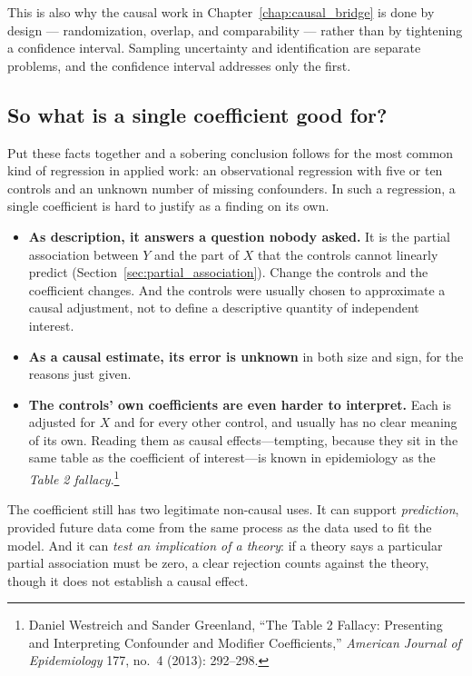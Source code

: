 \documentclass[11pt]{report}
\begin{document}
This is also why the causal work in Chapter~\ref{chap:causal_bridge} is done by design --- randomization, overlap, and comparability --- rather than by tightening a confidence interval. Sampling uncertainty and identification are separate problems, and the confidence interval addresses only the first.

\subsection{So what is a single coefficient good for?}

Put these facts together and a sobering conclusion follows for the most common kind of regression in applied work: an observational regression with five or ten controls and an unknown number of missing confounders. In such a regression, a single coefficient is hard to justify as a finding on its own.

\begin{itemize}[leftmargin=2em]
\item \textbf{As description, it answers a question nobody asked.} It is the partial association between \(Y\) and the part of \(X\) that the controls cannot linearly predict (Section~\ref{sec:partial_association}). Change the controls and the coefficient changes. And the controls were usually chosen to approximate a causal adjustment, not to define a descriptive quantity of independent interest.
\item \textbf{As a causal estimate, its error is unknown} in both size and sign, for the reasons just given.
\item \textbf{The controls' own coefficients are even harder to interpret.} Each is adjusted for \(X\) and for every other control, and usually has no clear meaning of its own. Reading them as causal effects---tempting, because they sit in the same table as the coefficient of interest---is known in epidemiology as the \emph{Table 2 fallacy}.\footnote{Daniel Westreich and Sander Greenland, ``The Table 2 Fallacy: Presenting and Interpreting Confounder and Modifier Coefficients,'' \emph{American Journal of Epidemiology} 177, no.~4 (2013): 292--298.}
\end{itemize}

The coefficient still has two legitimate non-causal uses. It can support \emph{prediction}, provided future data come from the same process as the data used to fit the model. And it can \emph{test an implication of a theory}: if a theory says a particular partial association must be zero, a clear rejection counts against the theory, though it does not establish a causal effect.
\end{document}

